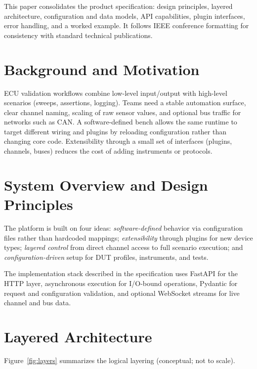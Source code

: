 \documentclass[conference]{IEEEtran}
\begin{document}
This paper consolidates the product specification: design principles, layered architecture, configuration and data models, API capabilities, plugin interfaces, error handling, and a worked example. It follows IEEE conference formatting for consistency with standard technical publications.

\section{Background and Motivation}

ECU validation workflows combine low-level input/output with high-level scenarios (sweeps, assertions, logging). Teams need a stable automation surface, clear channel naming, scaling of raw sensor values, and optional bus traffic for networks such as CAN. A software-defined bench allows the same runtime to target different wiring and plugins by reloading configuration rather than changing core code. Extensibility through a small set of interfaces (plugins, channels, buses) reduces the cost of adding instruments or protocols.

\section{System Overview and Design Principles}

The platform is built on four ideas: \emph{software-defined} behavior via configuration files rather than hardcoded mappings; \emph{extensibility} through plugins for new device types; \emph{layered control} from direct channel access to full scenario execution; and \emph{configuration-driven} setup for DUT profiles, instruments, and tests.

The implementation stack described in the specification uses FastAPI \cite{fastapi} for the HTTP layer, asynchronous execution for I/O-bound operations, Pydantic \cite{pydantic} for request and configuration validation, and optional WebSocket streams for live channel and bus data.

\section{Layered Architecture}

Figure~\ref{fig:layers} summarizes the logical layering (conceptual; not to scale).
\end{document}
